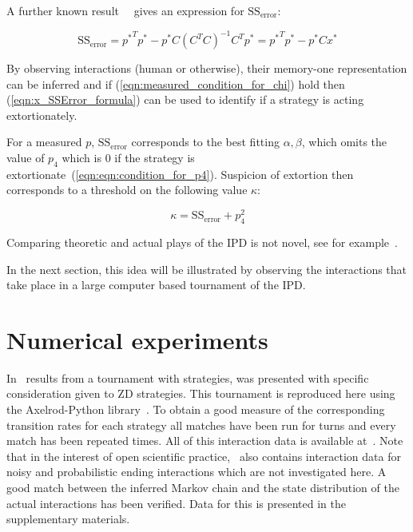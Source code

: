 \documentclass[a4paper]{article}
\begin{document}
A further known result~~\cite{kutner2004applied, rao1973linear,
wakefield2013bayesian} gives an expression for
\(\text{SS}_{\text{error}}\):

\begin{equation}\label{eqn:x_SSError_formula}
    \text{SS}_{\text{error}} = {p ^ *} ^ T p ^ * -
                               p ^ * C \left(C ^ T C \right) ^ {-1} C ^ T p ^ *
                             = {p ^ *} ^ T p ^ * - p ^ * C x ^ *
\end{equation}

By observing interactions (human or otherwise), their memory-one representation
can be inferred and if
(\ref{eqn:measured_condition_for_chi}) hold
then (\ref{eqn:x_SSError_formula}) can be used to identify if a strategy is
acting extortionately.

For a measured \(p\), \(\text{SS}_{\text{error}}\) corresponds to the best
fitting \(\alpha, \beta\), which omits the value of \(p_4\) which is 0 if the
strategy is extortionate~(\ref{eqn:eqn:condition_for_p4}). Suspicion of
extortion then corresponds to a threshold on the following value \(\kappa\):

\begin{equation}\label{eqn:kappa_definition}
    \kappa = \text{SS}_{\text{error}} + p_4 ^ 2
\end{equation}

Comparing theoretic and actual plays of the
IPD is not novel, see for example~\cite{Rand2013}.

In the next section, this idea will be illustrated by observing the interactions
that take place in a large computer based tournament of the IPD\@.

\section{Numerical experiments}\label{sec:numerical-experiments}

In~\cite{Stewart2012} results from a tournament with
 strategies,
was presented with specific consideration given to ZD strategies. This
tournament is reproduced here using the Axelrod-Python
library~\cite{Knight2016}. To obtain a good measure of the corresponding
transition rates for each strategy all matches have been run for
turns and every match has been
repeated times. All of this
interaction data is available at~\cite{vincent_knight_2018_1297075}. Note that
in the interest of open scientific practice,~\cite{vincent_knight_2018_1297075}
also contains interaction data for noisy and probabilistic ending interactions
which are not investigated here. A good
match between the inferred Markov chain and the state distribution of the actual
interactions has been verified. Data for this is presented in the supplementary
materials.
\end{document}
